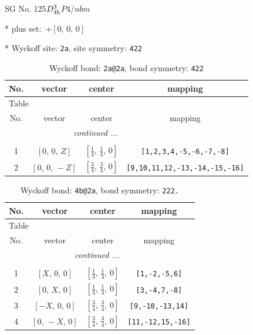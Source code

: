 \documentclass[fleqn,8pt]{jsarticle}
\begin{document}
\setcounter{MaxMatrixCols}{32}

\renewcommand{\tablename}{Table~}
\renewcommand{\figurename}{Figure~}
\begin{center}
\LARGE
SG No. 125\quad$D_{\rm 4h}^{3}$\quad$P4/nbm$\quad[ tetragonal ]
\end{center}

* plus set:\,\,\,$+\left[ 0,\, 0,\, 0 \right]$


* Wyckoff site: {\tt 2a}, site symmetry: {\tt 422}
\renewcommand{\arraystretch}{1.2}
\begin{longtable}{cccc}
\caption{Wyckoff bond: {\tt 2a@2a}, bond symmetry: {\tt 422}}
 \\
 \hline \hline
No. & vector & center & mapping \\ \hline \endfirsthead

\multicolumn{3}{l}{\tablename\ \thetable{}} \\
 \hline \hline
No. & vector & center & mapping \\ \hline \endhead

 \hline \hline
\multicolumn{3}{r}{\footnotesize\it continued ...} \\ \endfoot

 \hline \hline
\multicolumn{3}{r}{} \\ \endlastfoot

1 & $\left[ 0,\, 0,\, Z \right]$ & $\left[ \frac{1}{4},\, \frac{1}{4},\, 0 \right]$ & {\tt [1,2,3,4,-5,-6,-7,-8]} \\ \hline
2 & $\left[ 0,\, 0,\, - Z \right]$ & $\left[ \frac{3}{4},\, \frac{3}{4},\, 0 \right]$ & {\tt [9,10,11,12,-13,-14,-15,-16]} \\
\end{longtable}
\renewcommand{\arraystretch}{1.2}
\begin{longtable}{cccc}
\caption{Wyckoff bond: {\tt 4b@2a}, bond symmetry: {\tt 222.}}
 \\
 \hline \hline
No. & vector & center & mapping \\ \hline \endfirsthead

\multicolumn{3}{l}{\tablename\ \thetable{}} \\
 \hline \hline
No. & vector & center & mapping \\ \hline \endhead

 \hline \hline
\multicolumn{3}{r}{\footnotesize\it continued ...} \\ \endfoot

 \hline \hline
\multicolumn{3}{r}{} \\ \endlastfoot

1 & $\left[ X,\, 0,\, 0 \right]$ & $\left[ \frac{1}{4},\, \frac{1}{4},\, 0 \right]$ & {\tt [1,-2,-5,6]} \\ \hline
2 & $\left[ 0,\, X,\, 0 \right]$ & $\left[ \frac{1}{4},\, \frac{1}{4},\, 0 \right]$ & {\tt [3,-4,7,-8]} \\ \hline
3 & $\left[ - X,\, 0,\, 0 \right]$ & $\left[ \frac{3}{4},\, \frac{3}{4},\, 0 \right]$ & {\tt [9,-10,-13,14]} \\ \hline
4 & $\left[ 0,\, - X,\, 0 \right]$ & $\left[ \frac{3}{4},\, \frac{3}{4},\, 0 \right]$ & {\tt [11,-12,15,-16]} \\
\end{longtable}
\end{document}
